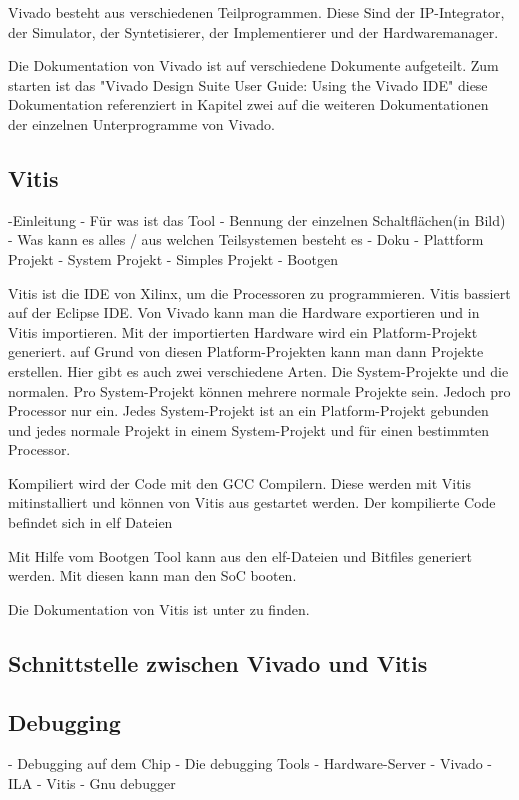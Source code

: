 \documentclass{article}
\begin{document}
Vivado besteht aus verschiedenen Teilprogrammen. Diese Sind der IP-Integrator, der Simulator, der Syntetisierer, der Implementierer und der Hardwaremanager.

Die Dokumentation von Vivado ist auf verschiedene Dokumente aufgeteilt. Zum starten ist das "Vivado Design Suite User Guide: Using the Vivado IDE" diese Dokumentation referenziert in Kapitel zwei auf die weiteren Dokumentationen der einzelnen Unterprogramme von Vivado.


\subsection{Vitis}
-Einleitung
    - Für was ist das Tool
    - Bennung der einzelnen Schaltflächen(in Bild)
    - Was kann es alles / aus welchen Teilsystemen besteht es
    - Doku
- Plattform Projekt
- System Projekt
- Simples Projekt
- Bootgen

Vitis ist die IDE von Xilinx, um die Processoren zu programmieren. Vitis bassiert auf der Eclipse IDE. 
Von Vivado kann man die Hardware exportieren und in Vitis importieren. Mit der importierten Hardware wird ein Platform-Projekt generiert. auf Grund von diesen Platform-Projekten kann man dann Projekte erstellen. Hier gibt es auch zwei verschiedene Arten. Die System-Projekte und die normalen. Pro System-Projekt können mehrere normale Projekte sein. Jedoch pro Processor nur ein. Jedes System-Projekt ist an ein Platform-Projekt gebunden und jedes normale Projekt in einem System-Projekt und für einen bestimmten Processor.

Kompiliert wird der Code mit den GCC Compilern. Diese werden mit Vitis mitinstalliert und können von Vitis aus gestartet werden. Der kompilierte Code befindet sich in elf Dateien

Mit Hilfe vom Bootgen Tool kann aus den elf-Dateien und Bitfiles generiert werden. Mit diesen kann man den SoC booten.

Die Dokumentation von Vitis ist unter  zu finden.

\subsection{Schnittstelle zwischen Vivado und Vitis}


\subsection{Debugging}
- Debugging auf dem Chip
- Die debugging Tools
    - Hardware-Server
    - Vivado
        - ILA
    - Vitis
        - Gnu debugger
\end{document}
